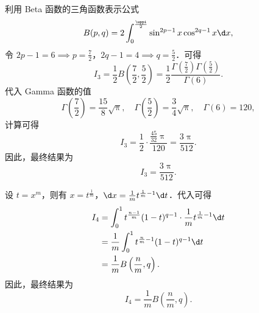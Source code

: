 \begin{solution}
    利用 Beta 函数的三角函数表示公式
    \begin{equation}\label{eq:sol3-1}
        B(p, q) = 2 \int_{0}^{\frac{\uppi}{2}} \sin^{2p-1} x \cos^{2q-1} x \d x,
    \end{equation}
    令 $2p-1 = 6 \implies p = \frac{7}{2}$，$2q-1 = 4 \implies q = \frac{5}{2}$．可得
    \begin{equation}\label{eq:sol3-2}
        I_3 = \frac{1}{2} B\left(\frac{7}{2}, \frac{5}{2}\right) = \frac{1}{2} \frac{\Gamma\left(\frac{7}{2}\right) \Gamma\left(\frac{5}{2}\right)}{\Gamma(6)}.
    \end{equation}
    代入 Gamma 函数的值
    \begin{equation}\label{eq:sol3-3}
        \Gamma\left(\frac{7}{2}\right) = \frac{15}{8}\sqrt{\uppi}, \quad \Gamma\left(\frac{5}{2}\right) = \frac{3}{4}\sqrt{\uppi}, \quad \Gamma(6) = 120,
    \end{equation}
    计算可得
    \begin{equation}\label{eq:sol3-4}
        I_3 = \frac{1}{2} \cdot \frac{\frac{45}{32}\uppi}{120} = \frac{3\uppi}{512}.
    \end{equation}
    因此，最终结果为
    \begin{equation}
        I_3 = \boxed{\frac{3\uppi}{512}}.
    \end{equation}


    设 $t = x^m$，则有 $x = t^{\frac{1}{m}}$，$\d x = \frac{1}{m} t^{\frac{1}{m}-1} \d t$．代入可得
    \begin{equation}\label{eq:sol4-1}
        \begin{aligned}
            I_4 & = \int_{0}^{1} t^{\frac{n-1}{m}} (1-t)^{q-1} \cdot \frac{1}{m} t^{\frac{1}{m}-1} \d t \\
                & = \frac{1}{m} \int_{0}^{1} t^{\frac{n}{m}-1} (1-t)^{q-1} \d t                         \\
                & = \frac{1}{m} B\left(\frac{n}{m}, q\right).
        \end{aligned}
    \end{equation}
    因此，最终结果为
    \begin{equation}
        I_4 = \boxed{\frac{1}{m} B\left(\frac{n}{m}, q\right)}.
    \end{equation}



\end{solution}
